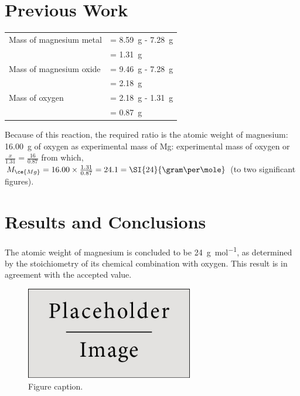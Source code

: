 \documentclass{article}
\begin{document}

\section{Previous Work}

\begin{tabular}{ll}
Mass of magnesium metal & = \SI{8.59}{\gram} - \SI{7.28}{\gram}\\
& = \SI{1.31}{\gram}\\
Mass of magnesium oxide & = \SI{9.46}{\gram} - \SI{7.28}{\gram}\\
& = \SI{2.18}{\gram}\\
Mass of oxygen & = \SI{2.18}{\gram} - \SI{1.31}{\gram}\\
& = \SI{0.87}{\gram}
\end{tabular}

Because of this reaction, the required ratio is the atomic weight of magnesium: \SI{16.00}{\gram} of oxygen as experimental mass of Mg: experimental mass of oxygen or $\frac{x}{1.31}=\frac{16}{0.87}$ from which, $M_{\ce{Mg}} = 16.00 \times \frac{1.31}{0.87} = 24.1 = \SI{24}{\gram\per\mole}$ (to two significant figures).


\section{Results and Conclusions}

The atomic weight of magnesium is concluded to be \SI{24}{\gram\per\mol}, as determined by the stoichiometry of its chemical combination with oxygen. This result is in agreement with the accepted value.

\begin{figure}[h]
\begin{center}
\includegraphics[width=0.65\textwidth]{placeholder} %
\caption{Figure caption.}
\end{center}
\end{figure}
\end{document}
